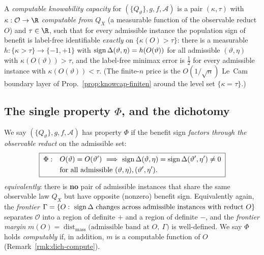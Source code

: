\begin{definition}\label{def:dich-cap}
A \emph{computable knowability capacity} for $(\{Q_\vartheta\},g,f,\mathcal A)$ is a
pair $(\kappa,\tau)$ with $\kappa:\mathcal O\to\R$ \emph{computable from $Q_X$}
(a measurable function of the observable reduct $O$) and $\tau\in\R$, such that for
every admissible instance the population sign of benefit is label-free identifiable
\emph{exactly} on $\{\kappa(O)>\tau\}$: there is a measurable
$h:\{\kappa>\tau\}\to\{-1,+1\}$ with $\operatorname{sign}\Delta(\vartheta,\eta)=h(O(\vartheta))$
for all admissible $(\vartheta,\eta)$ with $\kappa(O(\vartheta))>\tau$, and the
label-free minimax error is $\tfrac12$ for every admissible instance with
$\kappa(O(\vartheta))<\tau$. (The finite-$n$ price is the $O(1/\sqrt n)$ Le~Cam
boundary layer of Prop.~\ref{prop:knowcap-finiten} around the level set $\{\kappa=\tau\}$.)
\end{definition}

\subsection{The single property $\Phi$, and the dichotomy}\label{sec:dich-phi}
\begin{definition}\label{def:dich-phi}
We say $(\{Q_\vartheta\},g,f,\mathcal A)$ has property $\Phi$ if the benefit sign
\emph{factors through the observable reduct} on the admissible set:
\begin{equation}\label{eq:dich-phi}
  \boxed{\;
  \begin{aligned}
  \Phi:\quad & O(\vartheta)=O(\vartheta')\ \Longrightarrow\
  \operatorname{sign}\Delta(\vartheta,\eta)=\operatorname{sign}\Delta(\vartheta',\eta')\neq 0\\
  & \text{for all admissible }(\vartheta,\eta),(\vartheta',\eta').
  \end{aligned}\;}
\end{equation}
\emph{equivalently}: there is \textbf{no} pair of admissible instances that share the
same observable law $Q_X$ but have opposite (nonzero) benefit sign. Equivalently
again, the \emph{frontier} $\Gamma=\{O:\ \operatorname{sign}\Delta \text{ changes across admissible
instances with reduct }O\}$ separates $\mathcal O$ into a region of definite $+$ and a
region of definite $-$, and the \emph{frontier margin}
$m(O)=\operatorname{dist}_{\mathrm{mass}}\!\big(\text{admissible band at }O,\ \Gamma\big)$
is well-defined. We say $\Phi$ holds \emph{computably} if, in addition, $m$ is a
computable function of $O$ (Remark~\ref{rmk:dich-compute}).
\end{definition}

